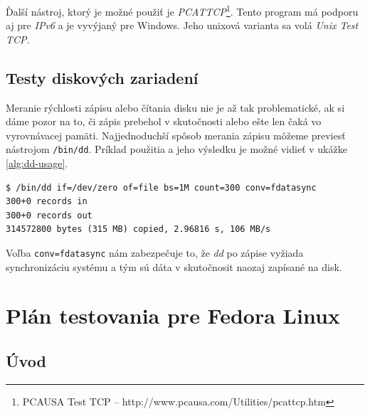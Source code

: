 %
%

Ďalší nástroj, ktorý je možné použiť je \emph{PCATTCP}\footnote{PCAUSA Test TCP
-- http://www.pcausa.com/Utilities/pcattcp.htm}. Tento program má podporu aj
pre \emph{IPv6} a je vyvýjaný pre Windows. Jeho unixová varianta sa volá
\emph{Unix Test TCP}. 

\section{Testy diskových zariadení}

Meranie rýchlosti zápisu alebo čítania disku nie je až tak problematické, ak si dáme pozor na to, či zápis prebehol v skutočnosti alebo ešte len čaká vo vyrovnávacej pamäti. Najjednoduchší spôsob merania zápisu môžeme previesť nástrojom \texttt{/bin/dd}. Príklad použitia a jeho výsledku je možné vidieť v ukážke \ref{alg:dd-usage}.
\\
\renewcommand{\lstlistingname}{Ukážka}
\begin{lstlisting}[label=alg:dd-usage,caption=Príklad použitia a výsledok nástroja dd]
$ /bin/dd if=/dev/zero of=file bs=1M count=300 conv=fdatasync
300+0 records in
300+0 records out
314572800 bytes (315 MB) copied, 2.96816 s, 106 MB/s
\end{lstlisting}
\renewcommand{\lstlistingname}{\listingAlgoritmus}

Voľba \texttt{conv=fdatasync} nám zabezpečuje to, že \emph{dd} po zápise vyžiada synchronizáciu systému a tým sú dáta v skutočnosit naozaj zapísané na disk.

%
%

\chapter{Plán testovania pre Fedora Linux}


\section{Úvod}


